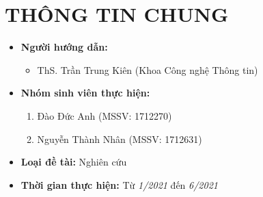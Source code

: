 \documentclass{article}[14pt]
\begin{document}
    \vspace{.5cm}
    
    \Large
    \section{THÔNG TIN CHUNG}
    \begin{itemize}[label = {}]
        
        \item \textbf{Người hướng dẫn:} 
        \begin{itemize}
            \item ThS. Trần Trung Kiên (Khoa Công nghệ Thông tin)
        \end{itemize}{}
    
        
        \item \textbf{Nhóm sinh viên thực hiện:}
        
        \begin{enumerate}
        
            \item Đào Đức Anh (MSSV: 1712270)
            \item Nguyễn Thành Nhân (MSSV: 1712631)
            
        \end{enumerate}

        \item \textbf{Loại đề tài:} Nghiên cứu
        
        \item \textbf{Thời gian thực hiện:} Từ \textit{1/2021} đến 
\textit{6/2021}
        
        
    \end{itemize}
    
\end{document}
